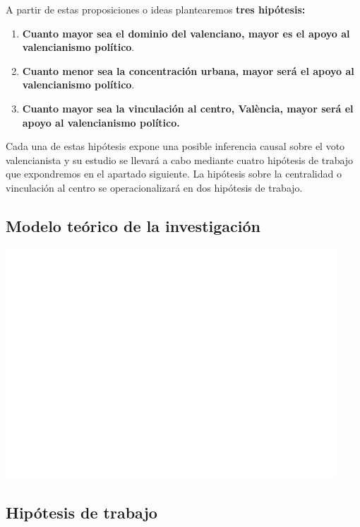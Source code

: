 \documentclass[
]{article}
\begin{document}
A partir de estas proposiciones o ideas plantearemos \textbf{tres
hipótesis:}

\begin{enumerate}
\def\labelenumi{\arabic{enumi}.}
\item
  \textbf{Cuanto mayor sea el dominio del valenciano, mayor es el apoyo
  al valencianismo político}.
\item
  \textbf{Cuanto menor sea la concentración urbana, mayor será el apoyo
  al valencianismo político}.
\item
  \textbf{Cuanto mayor sea la vinculación al centro, València, mayor
  será el apoyo al valencianismo político.}
\end{enumerate}

Cada una de estas hipótesis expone una posible inferencia causal sobre
el voto valencianista y su estudio se llevará a cabo mediante cuatro
hipótesis de trabajo que expondremos en el apartado siguiente. La
hipótesis sobre la centralidad o vinculación al centro se
operacionalizará en dos hipótesis de trabajo.

\hypertarget{modelo-teuxf3rico-de-la-investigaciuxf3n}{%
\subsection{Modelo teórico de la
investigación}\label{modelo-teuxf3rico-de-la-investigaciuxf3n}}

\includegraphics{votovalencianista-ea2023_files/figure-latex/modelo-1.png}

\hypertarget{hipuxf3tesis-de-trabajo}{%
\subsection{Hipótesis de trabajo}\label{hipuxf3tesis-de-trabajo}}
\end{document}
